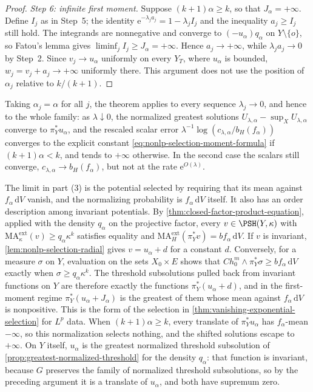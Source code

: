 \begin{proof}
\emph{Step 6: infinite first moment.} Suppose $(k+1)\alpha\geq k$, so that $J_\alpha=+\infty$. Define $I_j$ as in Step~5; the identity $\mathrm{e}^{-\lambda_ja_j}=1-\lambda_jI_j$ and the inequality $a_j\geq I_j$ still hold. The integrands are nonnegative and converge to $(-u_\alpha)q_\alpha$ on $Y\setminus\{o\}$, so Fatou's lemma gives $\liminf_jI_j\geq J_\alpha=+\infty$. Hence $a_j\to+\infty$, while $\lambda_ja_j\to0$ by Step~2. Since $v_j\to u_\alpha$ uniformly on every $Y_T$, where $u_\alpha$ is bounded, $w_j=v_j+a_j\to+\infty$ uniformly there. This argument does not use the position of $\alpha_j$ relative to $k/(k+1)$.
\end{proof}

Taking $\alpha_j=\alpha$ for all $j$, the theorem applies to every sequence $\lambda_j\to0$, and hence to the whole family: as $\lambda\downarrow0$, the normalized greatest solutions $U_{\lambda,\alpha}-\sup_XU_{\lambda,\alpha}$ converge to $\pi_Y^*u_\alpha$, and the rescaled scalar error $\lambda^{-1}\log(c_{\lambda,\alpha}/b_H(f_\alpha))$ converges to the explicit constant \eqref{eq:nonlp-selection-moment-formula} if $(k+1)\alpha<k$, and tends to $+\infty$ otherwise. In the second case the scalars still converge, $c_{\lambda,\alpha}\to b_H(f_\alpha)$, but not at the rate $\mathrm{e}^{O(\lambda)}$.

The limit in part (3) is the potential selected by requiring that its mean against $f_\alpha\,\mathrm{d}V$ vanish, and the normalizing probability is $f_\alpha\,\mathrm{d}V$ itself. It also has an order description among invariant potentials. By \cref{thm:closed-factor-product-equation}, applied with the density $q_\alpha$ on the projective factor, every $v\in\PSH(Y,\kappa)$ with $\mathrm{MA}^{\mathrm{ext}}_\kappa(v)\geq q_\alpha\kappa^k$ satisfies equality and $\mathrm{MA}^{\mathrm{ext}}_H(\pi_Y^*v)=bf_\alpha\,\mathrm{d}V$. If $v$ is invariant, \cref{lem:nonlp-selection-radial} gives $v=u_\alpha+d$ for a constant $d$. Conversely, for a measure $\sigma$ on $Y$, evaluation on the sets $X_0\times E$ shows that $Ch_0^m\wedge\pi_Y^*\sigma\geq bf_\alpha\,\mathrm{d}V$ exactly when $\sigma\geq q_\alpha\kappa^k$. The threshold subsolutions pulled back from invariant functions on $Y$ are therefore exactly the functions $\pi_Y^*(u_\alpha+d)$, and in the first-moment regime $\pi_Y^*(u_\alpha+J_\alpha)$ is the greatest of them whose mean against $f_\alpha\,\mathrm{d}V$ is nonpositive. This is the form of the selection in \cref{thm:vanishing-exponential-selection} for $L^p$ data. When $(k+1)\alpha\geq k$, every translate of $\pi_Y^*u_\alpha$ has $f_\alpha$-mean $-\infty$, so this normalization selects nothing, and the shifted solutions escape to $+\infty$. On $Y$ itself, $u_\alpha$ is the greatest normalized threshold subsolution of \cref{prop:greatest-normalized-threshold} for the density $q_\alpha$: that function is invariant, because $G$ preserves the family of normalized threshold subsolutions, so by the preceding argument it is a translate of $u_\alpha$, and both have supremum zero.

